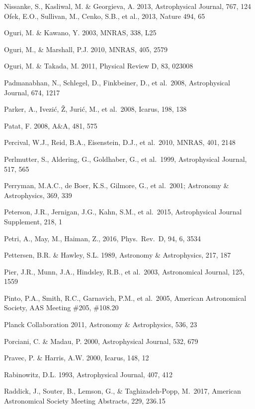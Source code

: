\documentclass[twocolumn]{aastex61}
\begin{document}
\begin{thebibliography}{}
\bibitem[()]{} Nissanke, S., Kasliwal, M. \& Georgieva, A. 2013,  Astrophysical Journal, 767, 124
\bibitem[()]{} Ofek, E.O.,  Sullivan, M., Cenko, S.B., et al., 2013, Nature 494, 65

\bibitem[()]{} Oguri, M. \& Kawano, Y. 2003, MNRAS, 338, L25

\bibitem[()]{} Oguri, M., \& Marshall, P.J. 2010, MNRAS, 405, 2579

\bibitem[()]{} Oguri, M. \& Takada, M. 2011, Physical Review D, 83, 023008

\bibitem[()]{} Padmanabhan, N., Schlegel, D., Finkbeiner, D., et al.~2008, Astrophysical Journal, 674, 1217

\bibitem[()]{} Parker, A., Ivezi\'{c}, \v{Z}, Juri\'{c}, M., et al.~2008, Icarus, 198, 138

\bibitem[()]{} Patat, F. 2008, A\&A, 481, 575

\bibitem[()]{} Percival, W.J., Reid, B.A., Eisenstein, D.J., et al.~2010, MNRAS, 401, 2148

\bibitem[()]{} Perlmutter, S., Aldering, G., Goldhaber, G., et al.~1999, Astrophysical Journal, 517, 565

\bibitem[()]{} Perryman, M.A.C., de Boer, K.S., Gilmore, G., et al.~2001; Astronomy \&
             Astrophysics, 369, 339

\bibitem[()]{} Peterson, J.R., Jernigan, J.G., Kahn, S.M., et al.~2015, Astrophysical Journal Supplement, 218, 1

\bibitem[()]{} Petri, A., May, M., Haiman, Z., 2016, Phys.~Rev.~D, 94, 6, 3534

\bibitem[()]{} Pettersen, B.R. \& Hawley, S.L. 1989, Astronomy \& Astrophysics, 217, 187

\bibitem[()]{} Pier, J.R., Munn, J.A., Hindsley, R.B., et al.~2003, Astronomical Journal, 125, 1559

\bibitem[()]{} Pinto, P.A., Smith, R.C., Garnavich, P.M., et al.~2005,
              American Astronomical Society, AAS Meeting \#205, \#108.20

\bibitem[()]{} Planck Collaboration 2011,  Astronomy \& Astrophysics, 536, 23

\bibitem[()]{} Porciani, C. \& Madau, P. 2000, Astrophysical Journal, 532, 679

\bibitem[()]{} Pravec, P. \& Harris, A.W. 2000, Icarus, 148, 12

\bibitem[()]{} Rabinowitz, D.L. 1993,  Astrophysical Journal, 407, 412

 Raddick, J., Souter, B., Lemson, G., \& Taghizadeh-Popp, M.\ 2017, American Astronomical Society Meeting Abstracts, 229, 236.15


\end{thebibliography}
\end{document}
